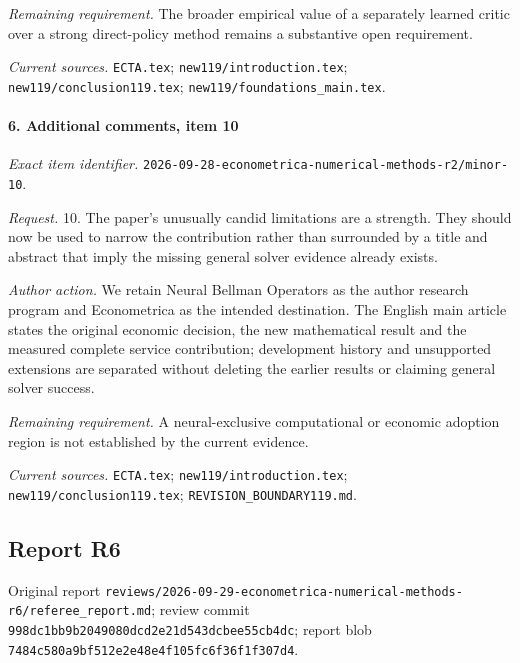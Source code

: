 \par\emph{Remaining requirement.} The broader empirical value of a separately learned critic over a strong direct-policy method remains a substantive open requirement.

\par\emph{Current sources.} \nolinkurl{ECTA.tex}; \nolinkurl{new119/introduction.tex}; \nolinkurl{new119/conclusion119.tex}; \nolinkurl{new119/foundations_main.tex}.

\paragraph{6. Additional comments, item 10}

\emph{Exact item identifier.} \nolinkurl{2026-09-28-econometrica-numerical-methods-r2/minor-10}.

\par\emph{Request.} 10. The paper's unusually candid limitations are a strength. They should now be used to narrow the contribution rather than surrounded by a title and abstract that imply the missing general solver evidence already exists.

\par\emph{Author action.} We retain Neural Bellman Operators as the author research program and Econometrica as the intended destination. The English main article states the original economic decision, the new mathematical result and the measured complete service contribution; development history and unsupported extensions are separated without deleting the earlier results or claiming general solver success.

\par\emph{Remaining requirement.} A neural-exclusive computational or economic adoption region is not established by the current evidence.

\par\emph{Current sources.} \nolinkurl{ECTA.tex}; \nolinkurl{new119/introduction.tex}; \nolinkurl{new119/conclusion119.tex}; \nolinkurl{REVISION_BOUNDARY119.md}.

\subsection{Report R6}

Original report \nolinkurl{reviews/2026-09-29-econometrica-numerical-methods-r6/referee_report.md}; review commit \nolinkurl{998dc1bb9b2049080dcd2e21d543dcbee55cb4dc}; report blob \nolinkurl{7484c580a9bf512e2e48e4f105fc6f36f1f307d4}.

